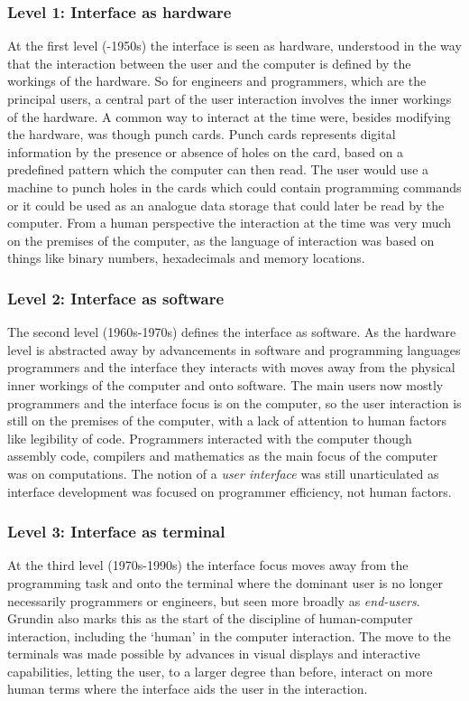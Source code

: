 \subsubsection{Level 1: Interface as hardware}
At the first level (-1950s) the interface is seen as hardware, understood in the way that the interaction between the user and the computer is defined by the workings of the hardware.
So for engineers and programmers, which are the principal users, a central part of the user interaction involves the inner workings of the hardware.
A common way to interact at the time were, besides modifying the hardware, was though punch cards.
Punch cards represents digital information by the presence or absence of holes on the card, based on a predefined pattern which the computer can then read.
The user would use a machine to punch holes in the cards which could contain programming commands or it could be used as an analogue data storage that could later be read by the computer.
From a human perspective the interaction at the time was very much on the premises of the computer, as the language of interaction was based on things like binary numbers, hexadecimals and memory locations.

\subsubsection{Level 2: Interface as software}
The second level (1960s-1970s) defines the interface as software.
As the hardware level is abstracted away by advancements in software and programming languages programmers and the interface they interacts with moves away from the physical inner workings of the computer and onto software.
The main users now mostly programmers and the interface focus is on the computer, so the user interaction is still on the premises of the computer, with a lack of attention to human factors like legibility of code.
Programmers interacted with the computer though assembly code, compilers and mathematics as the main focus of the computer was on computations. The notion of a \emph{user interface} was still unarticulated as interface development was focused on programmer efficiency, not human factors.

\subsubsection{Level 3: Interface as terminal}
At the third level (1970s-1990s) the interface focus moves away from the programming task and onto the terminal where the dominant user is no longer necessarily programmers or engineers, but seen more broadly as \emph{end-users}.
Grundin also marks this as the start of the discipline of human-computer interaction, including the `human' in the computer interaction.
The move to the terminals was made possible by advances in visual displays and interactive capabilities, letting the user, to a larger degree than before, interact on more human terms where the interface aids the user in the interaction.

